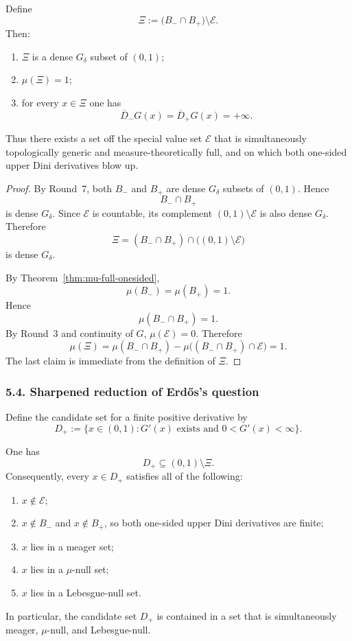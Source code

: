\begin{corollary}\label{cor:Xi}
Define
\[
\Xi:=\bigl(B_-\cap B_+\bigr)\setminus\mathcal E.
\]
Then:
\begin{enumerate}
\item $\Xi$ is a dense $G_\delta$ subset of $(0,1)$;
\item $\mu(\Xi)=1$;
\item for every $x\in\Xi$ one has
\[
\overline D_-G(x)=\overline D_+G(x)=+\infty.
\]
\end{enumerate}
Thus there exists a set off the special value set $\mathcal E$ that is simultaneously topologically generic and measure-theoretically full, and on which both one-sided upper Dini derivatives blow up.
\end{corollary}

\begin{proof}
By Round~7, both $B_-$ and $B_+$ are dense $G_\delta$ subsets of $(0,1)$.
Hence
\[
B_-\cap B_+
\]
is dense $G_\delta$.
Since $\mathcal E$ is countable, its complement $(0,1)\setminus\mathcal E$ is also dense $G_\delta$.
Therefore
\[
\Xi=(B_-\cap B_+)\cap\bigl((0,1)\setminus\mathcal E\bigr)
\]
is dense $G_\delta$.

By Theorem~\ref{thm:mu-full-onesided},
\[
\mu(B_-)=\mu(B_+)=1.
\]
Hence
\[
\mu(B_-\cap B_+)=1.
\]
By Round~3 and continuity of $G$, $\mu(\mathcal E)=0$. Therefore
\[
\mu(\Xi)=\mu(B_-\cap B_+)-\mu\bigl((B_-\cap B_+)\cap\mathcal E\bigr)=1.
\]
The last claim is immediate from the definition of $\Xi$.
\end{proof}

\subsubsection*{5.4. Sharpened reduction of Erd\H{o}s's question}

Define the candidate set for a finite positive derivative by
\[
D_+:=\{x\in(0,1): G'(x)\text{ exists and }0<G'(x)<\infty\}.
\]

\begin{corollary}\label{cor:quadruple-exceptional}
One has
\[
D_+\subseteq (0,1)\setminus\Xi.
\]
Consequently, every $x\in D_+$ satisfies all of the following:
\begin{enumerate}
\item $x\notin\mathcal E$;
\item $x\notin B_-$ and $x\notin B_+$, so both one-sided upper Dini derivatives are finite;
\item $x$ lies in a meager set;
\item $x$ lies in a $\mu$-null set;
\item $x$ lies in a Lebesgue-null set.
\end{enumerate}
In particular, the candidate set $D_+$ is contained in a set that is simultaneously meager, $\mu$-null, and Lebesgue-null.
\end{corollary}

